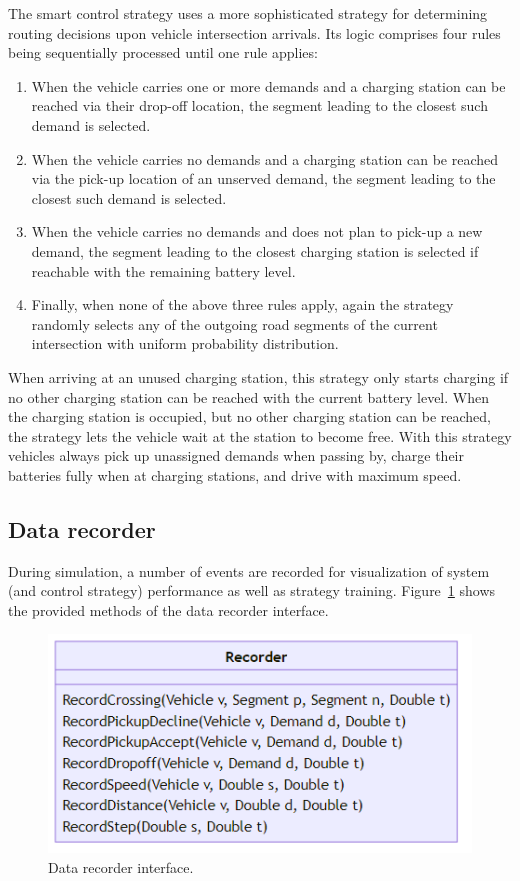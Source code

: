 \documentclass[a4paper,twoside]{article}
\begin{document}
	The smart control strategy uses a more sophisticated strategy for determining routing decisions upon vehicle intersection arrivals.
	Its logic comprises four rules being sequentially processed until one rule applies:
	\begin{enumerate}
		\item When the vehicle carries one or more demands and a charging station can be reached via their drop-off location, the segment leading to the closest such demand is selected.
		\item When the vehicle carries no demands and a charging station can be reached via the pick-up location of an unserved demand, the segment leading to the closest such demand is selected.
		\item When the vehicle carries no demands and does not plan to pick-up a new demand, the segment leading to the closest charging station is selected if reachable with the remaining battery level.
		\item Finally, when none of the above three rules apply, again the strategy randomly selects any of the outgoing road segments of the current intersection with uniform probability distribution.
	\end{enumerate}
	When arriving at an unused charging station, this strategy only starts charging if no other charging station can be reached with the current battery level.
	When the charging station is occupied, but no other charging station can be reached, the strategy lets the vehicle wait at the station to become free.
	With this strategy vehicles always pick up unassigned demands when passing by, charge their batteries fully when at charging stations, and drive with maximum speed.
	
	\subsection{Data recorder}
	\label{sec:statistics-interface}
	
	During simulation, a number of events are recorded for visualization of system (and control strategy) performance as well as strategy training.
	Figure~\ref{fig:statistics-interface} shows the provided methods of the data recorder interface.
	
	\begin{figure}[!ht]
		\centering
		\includegraphics[scale=0.3]{./graphics/interfaces/recorder.png}
		\caption{Data recorder interface.}
		\label{fig:statistics-interface}
	\end{figure}
	
\end{document}
